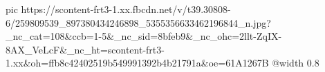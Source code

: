  
 
 
 
 

\ifcmt
  pic https://scontent-frt3-1.xx.fbcdn.net/v/t39.30808-6/259809539_897380434246898_5355356633462196844_n.jpg?_nc_cat=108&ccb=1-5&_nc_sid=8bfeb9&_nc_ohc=2llt-ZqIX-8AX_VeLcF&_nc_ht=scontent-frt3-1.xx&oh=ffb8c42402519b549991392b4b21791a&oe=61A1267B
  @width 0.8
\fi


